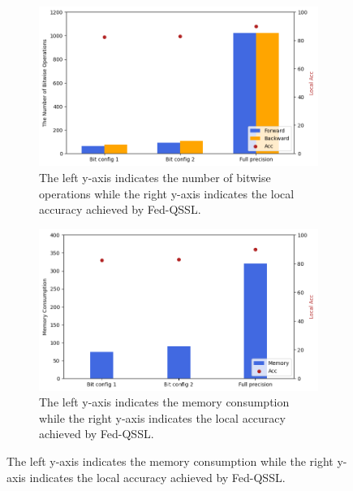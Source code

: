 \begin{figure}
\centering
    \begin{subfigure}
  \centering
  \includegraphics[width=.8\linewidth]{computation_cost.png}
  \caption{The left y-axis indicates the number of bitwise operations while the right y-axis indicates the local accuracy achieved by Fed-QSSL.}
  \label{fig:sfig1}
\end{subfigure}
\vspace{2mm}
\begin{subfigure}
  \centering
  \includegraphics[width=.8\linewidth]{memory_cost_1.png}
  \caption{The left y-axis indicates the memory consumption while the right y-axis indicates the local accuracy achieved by Fed-QSSL.}
  \label{fig:sfig2}
\end{subfigure}
\end{figure}

